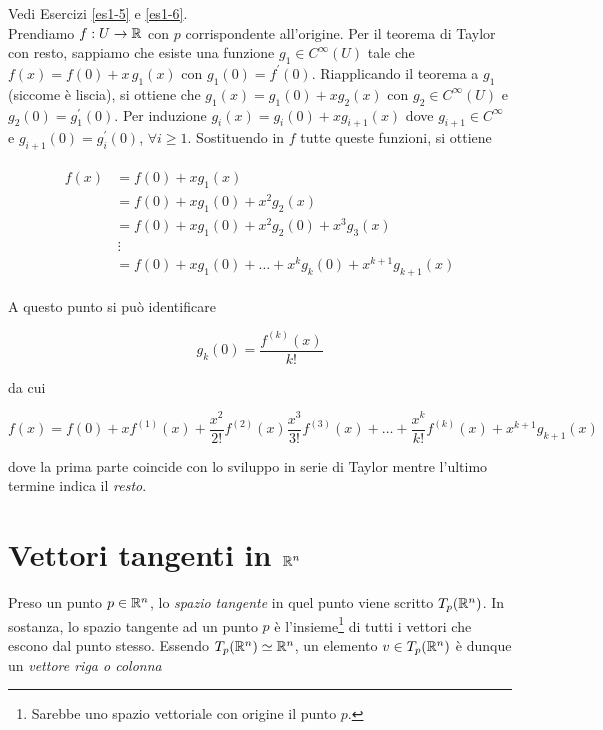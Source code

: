 Vedi Esercizi \ref{es1-5} e \ref{es1-6}.\\
Prendiamo $ f : U \to \mathbb{R} $ con $ p $ corrispondente all'origine. Per il teorema di Taylor con resto, sappiamo che esiste una funzione $ g_{1} \in C^{\infty}(U) $ tale che $ f(x) = f(0) + x \, g_{1}(x) $ con $ g_{1}(0) = f^{\prime}(0) $. Riapplicando il teorema a $ g_{1} $ (siccome è liscia), si ottiene che $ g_{1}(x) = g_{1}(0) + x g_{2}(x) $ con $ g_{2} \in C^{\infty}(U) $ e $ g_{2}(0) = g_{1}^{\prime}(0) $. Per induzione $ g_{i}(x) = g_{i}(0) + x g_{i+1}(x) $ dove $ g_{i+1} \in C^{\infty} $ e $ g_{i+1}(0) = g_{i}^{\prime}(0) $, $ \forall i \geqslant 1 $. Sostituendo in $ f $ tutte queste funzioni, si ottiene

\begin{align}
	\begin{split}
			f(x) &= f(0) + x g_{1}(x)\\
			&= f(0) + x g_{1}(0) + x^{2} g_{2}(x)\\
			&= f(0) + x g_{1}(0) + x^{2} g_{2}(0) + x^{3} g_{3}(x)\\
			& \, \vdots\\
			&= f(0) + x g_{1}(0) + \dots + x^{k} g_{k}(0) + x^{k+1} g_{k+1}(x)
	\end{split}
\end{align}

A questo punto si può identificare

\begin{equation}
	g_{k}(0) = \dfrac{f^{(k)}(x)}{k!}
\end{equation}

da cui

\begin{equation}
	f(x) = f(0) + x f^{(1)}(x) + \dfrac{x^{2}}{2!} f^{(2)}(x) \dfrac{x^{3}}{3!} f^{(3)}(x) + \dots + \dfrac{x^{k}}{k!} f^{(k)}(x) + x^{k+1} g_{k+1}(x)
\end{equation}

dove la prima parte coincide con lo sviluppo in serie di Taylor mentre l'ultimo termine indica il \textit{resto}.

\section{Vettori tangenti in $ \mathbb{R}^{n} $}

Preso un punto $ p \in \mathbb{R}^{n} $, lo \textit{spazio tangente} in quel punto viene scritto $ T_{p}(\mathbb{R}^{n}) $. In sostanza, lo spazio tangente ad un punto $ p $ è l'insieme\footnote{%
	Sarebbe uno spazio vettoriale con origine il punto $ p $.%
} di tutti i vettori che escono dal punto stesso. Essendo $ T_{p}(\mathbb{R}^{n}) \simeq \mathbb{R}^{n} $, un elemento $ v \in T_{p}(\mathbb{R}^{n}) $ è dunque un \textit{vettore riga o colonna}

